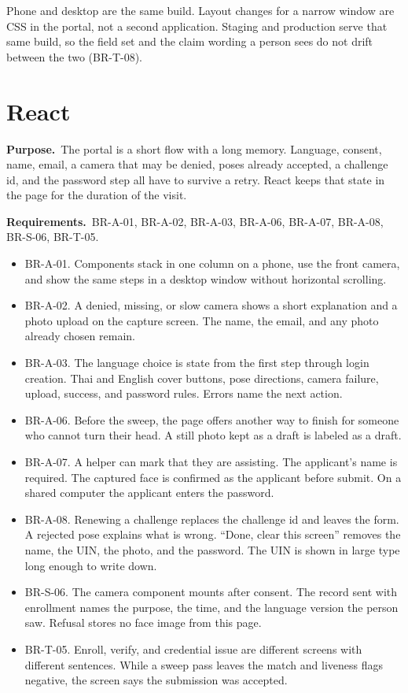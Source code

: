\documentclass[11pt]{article}
\newcommand{\why}[1]{\textbf{Purpose.}\ #1\par}
\newcommand{\serves}[1]{\textbf{Requirements.}\ #1\par}
\begin{document}
Phone and desktop are the same build. Layout changes for a narrow window are CSS in the portal, not a second application. Staging and production serve that same build, so the field set and the claim wording a person sees do not drift between the two (BR-T-08).

\section{React}

\why{The portal is a short flow with a long memory. Language, consent, name, email, a camera that may be denied, poses already accepted, a challenge id, and the password step all have to survive a retry. React keeps that state in the page for the duration of the visit.}
\serves{BR-A-01, BR-A-02, BR-A-03, BR-A-06, BR-A-07, BR-A-08, BR-S-06, BR-T-05.}

\begin{itemize}
  \item BR-A-01. Components stack in one column on a phone, use the front camera, and show the same steps in a desktop window without horizontal scrolling.
  \item BR-A-02. A denied, missing, or slow camera shows a short explanation and a photo upload on the capture screen. The name, the email, and any photo already chosen remain.
  \item BR-A-03. The language choice is state from the first step through login creation. Thai and English cover buttons, pose directions, camera failure, upload, success, and password rules. Errors name the next action.
  \item BR-A-06. Before the sweep, the page offers another way to finish for someone who cannot turn their head. A still photo kept as a draft is labeled as a draft.
  \item BR-A-07. A helper can mark that they are assisting. The applicant's name is required. The captured face is confirmed as the applicant before submit. On a shared computer the applicant enters the password.
  \item BR-A-08. Renewing a challenge replaces the challenge id and leaves the form. A rejected pose explains what is wrong. ``Done, clear this screen'' removes the name, the UIN, the photo, and the password. The UIN is shown in large type long enough to write down.
  \item BR-S-06. The camera component mounts after consent. The record sent with enrollment names the purpose, the time, and the language version the person saw. Refusal stores no face image from this page.
  \item BR-T-05. Enroll, verify, and credential issue are different screens with different sentences. While a sweep pass leaves the match and liveness flags negative, the screen says the submission was accepted.
\end{itemize}
\end{document}
